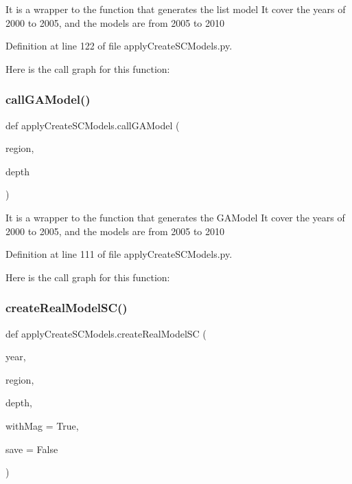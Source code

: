 \begin{DoxyVerb}It is a wrapper to the function that generates the list model
It cover the years of 2000 to 2005, and the models are from 2005 to 2010
\end{DoxyVerb}
 

Definition at line 122 of file apply\+Create\+S\+C\+Models.\+py.

Here is the call graph for this function\+:
\mbox{\label{namespaceapply_create_s_c_models_ababbf819f509b367f2bb9cda41e8d856}} 
\subsubsection{\texorpdfstring{call\+G\+A\+Model()}{callGAModel()}}
{\footnotesize\ttfamily def apply\+Create\+S\+C\+Models.\+call\+G\+A\+Model (\begin{DoxyParamCaption}\item[{}]{region,  }\item[{}]{depth }\end{DoxyParamCaption})}

\begin{DoxyVerb}It is a wrapper to the function that generates the GAModel
It cover the years of 2000 to 2005, and the models are from 2005 to 2010
\end{DoxyVerb}
 

Definition at line 111 of file apply\+Create\+S\+C\+Models.\+py.

Here is the call graph for this function\+:
\mbox{\label{namespaceapply_create_s_c_models_ab9bac5d8263793efc4b8db3b957a2087}} 
\subsubsection{\texorpdfstring{create\+Real\+Model\+S\+C()}{createRealModelSC()}}
{\footnotesize\ttfamily def apply\+Create\+S\+C\+Models.\+create\+Real\+Model\+SC (\begin{DoxyParamCaption}\item[{}]{year,  }\item[{}]{region,  }\item[{}]{depth,  }\item[{}]{with\+Mag = {\ttfamily True},  }\item[{}]{save = {\ttfamily False} }\end{DoxyParamCaption})}


